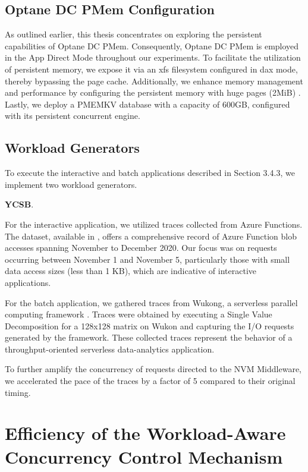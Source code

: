 \subsection{Optane DC PMem Configuration}
As outlined earlier, this thesis concentrates on exploring the persistent capabilities of Optane DC PMem. Consequently, Optane DC PMem is employed in the App Direct Mode throughout our experiments. To facilitate the utilization of persistent memory, we expose it via an xfs filesystem configured in dax mode, thereby bypassing the page cache. Additionally, we enhance memory management and performance by configuring the persistent memory with huge pages (2MiB) \cite{Speeding28:online}. Lastly, we deploy a PMEMKV database with a capacity of 600GB, configured with its persistent concurrent engine.

\subsection{Workload Generators}

To execute the interactive and batch applications described in Section 3.4.3, we implement two workload generators.

\textbf{YCSB}. 

For the interactive application, we utilized traces collected from Azure Functions. The dataset, available in \cite{GitHubAz35:online}, offers a comprehensive record of Azure Function blob accesses spanning November to December 2020. Our focus was on requests occurring between November 1 and November 5, particularly those with small data access sizes (less than 1 KB), which are indicative of interactive applications.

For the batch application, we gathered traces from Wukong, a serverless parallel computing framework \cite{carver2020wukong}. Traces were obtained by executing a Single Value Decomposition for a 128x128 matrix on Wukon and capturing the I/O requests generated by the framework. These collected traces represent the behavior of a throughput-oriented serverless data-analytics application.

To further amplify the concurrency of requests directed to the NVM Middleware, we accelerated the pace of the traces by a factor of 5 compared to their original timing.

\section{Efficiency of the Workload-Aware Concurrency Control Mechanism}

